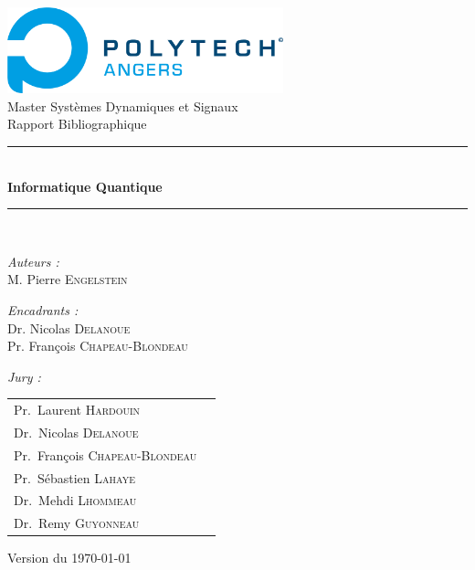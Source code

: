 \documentclass[12pt,a4paper]{report}
\begin{document}
\begin{titlepage}
    \begin{center}
    
    \includegraphics[width=0.6\textwidth]{Polytech_Angers.png}\\[1cm]
    
    {\large Master Systèmes Dynamiques et Signaux}\\[0.5cm]
    
    {\large Rapport Bibliographique}\\[0.5cm]
    
    \rule{\linewidth}{0.5mm} \\[0.4cm]
    { \huge \bfseries Informatique Quantique \\[0.4cm] }
    \rule{\linewidth}{0.5mm} \\[1.5cm]
    
    \noindent
    \begin{minipage}{0.4\textwidth}
      \begin{flushleft} \large
        \emph{Auteurs :}\\
        M. Pierre \textsc{Engelstein}\\
         \end{flushleft}
         \end{minipage}%
         \begin{minipage}{0.4\textwidth}
         \begin{flushright} \large
        \emph{Encadrants :}\\
        Dr. Nicolas \textsc{Delanoue}\\
        Pr. François \textsc{Chapeau-Blondeau}\\
         \end{flushright}
    \end{minipage}
    
    \vfill
    
    \large
    \emph{Jury :}
    \begin{tabular}{lc}
        Pr.~Laurent \textsc{Hardouin}\\
        Dr.~Nicolas \textsc{Delanoue}\\
        Pr.~François \textsc{Chapeau-Blondeau}\\
        Pr.~Sébastien \textsc{Lahaye}\\
        Dr.~Mehdi  \textsc{Lhommeau}\\
        Dr.~Remy  \textsc{Guyonneau}\\
    \end{tabular}
    
    \vspace{1cm}
    {\large Version  du \today}
    
    \end{center}
\end{titlepage}
\end{document}
